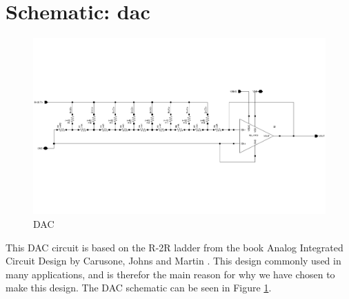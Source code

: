 \documentclass[english, a4paper,11pt]{article}
\begin{document}
\section*{Schematic: dac}
\begin{figure}[!ht]
 \centering
   \includegraphics[width=\textwidth]{img/dac}
   \caption{DAC}
   \label{dac}
\end{figure}
This DAC circuit is based on the R-2R ladder from the book Analog Integrated Circuit Design by Carusone, Johns and Martin \cite{carusone}. This design commonly used in many applications, and
is therefor the main reason for why we have chosen to make this design. The DAC schematic can be seen in Figure \ref{dac}.
\end{document}
